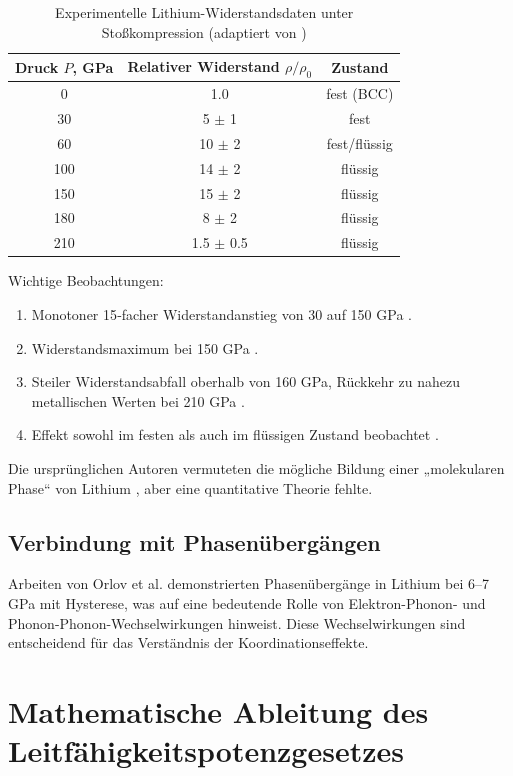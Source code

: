 \documentclass[12pt,a4paper]{article}
\theoremstyle{remark}
\begin{document}
	\begin{table}[h]
		\centering
		\caption{Experimentelle Lithium-Widerstandsdaten unter Stoßkompression (adaptiert von \cite{fortov2001, yakushev2002})}
		\label{tab:exp_data}
		\begin{tabular}{ccc}
			\toprule
			Druck \(P\), GPa & Relativer Widerstand \(\rho/\rho_0\) & Zustand \\
			\midrule
			0 & 1.0 & fest (BCC) \\
			30 & 5 \(\pm\) 1 & fest \\
			60 & 10 \(\pm\) 2 & fest/flüssig \\
			100 & 14 \(\pm\) 2 & flüssig \\
			150 & 15 \(\pm\) 2 & flüssig \\
			180 & 8 \(\pm\) 2 & flüssig \\
			210 & 1.5 \(\pm\) 0.5 & flüssig \\
			\bottomrule
		\end{tabular}
	\end{table}
	
	Wichtige Beobachtungen:
	\begin{enumerate}
		\item Monotoner 15‑facher Widerstandanstieg von 30 auf 150 GPa \cite{fortov2001}.
		\item Widerstandsmaximum bei 150 GPa \cite{yakushev2002}.
		\item Steiler Widerstandsabfall oberhalb von 160 GPa, Rückkehr zu nahezu metallischen Werten bei 210 GPa \cite{yakushev2002}.
		\item Effekt sowohl im festen als auch im flüssigen Zustand beobachtet \cite{fortov2001}.
	\end{enumerate}
	
	Die ursprünglichen Autoren vermuteten die mögliche Bildung einer „molekularen Phase“ von Lithium \cite{fortov1999}, aber eine quantitative Theorie fehlte.
	
	\subsection{Verbindung mit Phasenübergängen}
	
	Arbeiten von Orlov et al. \cite{orlov2001} demonstrierten Phasenübergänge in Lithium bei 6–7 GPa mit Hysterese, was auf eine bedeutende Rolle von Elektron-Phonon- und Phonon-Phonon-Wechselwirkungen hinweist. Diese Wechselwirkungen sind entscheidend für das Verständnis der Koordinationseffekte.
	
	\section{Mathematische Ableitung des Leitfähigkeitspotenzgesetzes}
	
\end{document}
